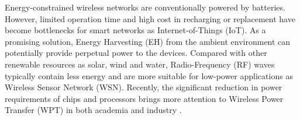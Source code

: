 Energy-constrained wireless networks are conventionally powered by batteries. However, limited operation time and high cost in recharging or replacement have become bottlenecks for smart networks as Internet-of-Things (IoT). As a promising solution, Energy Harvesting (EH) from the ambient environment can potentially provide perpetual power to the devices. Compared with other renewable resources as solar, wind and water, Radio-Frequency (RF) waves typically contain less energy and are more suitable for low-power applications as Wireless Sensor Network (WSN). Recently, the significant reduction in power requirements of chips and processors brings more attention to Wireless Power Transfer (WPT) in both academia and industry \cite{R.Varshney2008, Grover2010, Zhang2013, Hui2014, Krikidis2014, Valenta2014, Boshkovska2015, Ding2015, Costanzo2016, Clerckx2018a}.

